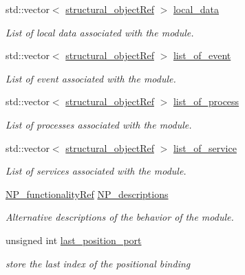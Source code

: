 \begin{DoxyCompactItemize}
std\+::vector$<$ \hyperlink{structural__objects_8hpp_a8ea5f8cc50ab8f4c31e2751074ff60b2}{structural\+\_\+object\+Ref} $>$ \hyperlink{classmodule_a8b44d9d75fa61b8dd0fc7d7859b59274}{local\+\_\+data}
\begin{DoxyCompactList}\small\item\em List of local data associated with the module. \end{DoxyCompactList}\item 
std\+::vector$<$ \hyperlink{structural__objects_8hpp_a8ea5f8cc50ab8f4c31e2751074ff60b2}{structural\+\_\+object\+Ref} $>$ \hyperlink{classmodule_a421dffcbfc875ebb774e447559f16623}{list\+\_\+of\+\_\+event}
\begin{DoxyCompactList}\small\item\em List of event associated with the module. \end{DoxyCompactList}\item 
std\+::vector$<$ \hyperlink{structural__objects_8hpp_a8ea5f8cc50ab8f4c31e2751074ff60b2}{structural\+\_\+object\+Ref} $>$ \hyperlink{classmodule_afc76e2f7629ee00a39914d17e6b9f6de}{list\+\_\+of\+\_\+process}
\begin{DoxyCompactList}\small\item\em List of processes associated with the module. \end{DoxyCompactList}\item 
std\+::vector$<$ \hyperlink{structural__objects_8hpp_a8ea5f8cc50ab8f4c31e2751074ff60b2}{structural\+\_\+object\+Ref} $>$ \hyperlink{classmodule_aad1399af2e7d2c801d32cd6cac605876}{list\+\_\+of\+\_\+service}
\begin{DoxyCompactList}\small\item\em List of services associated with the module. \end{DoxyCompactList}\item 
\hyperlink{NP__functionality_8hpp_aacd74315d343c1054cd3c01e18627049}{N\+P\+\_\+functionality\+Ref} \hyperlink{classmodule_a4277830832806c906445867354a3328c}{N\+P\+\_\+descriptions}
\begin{DoxyCompactList}\small\item\em Alternative descriptions of the behavior of the module. \end{DoxyCompactList}\item 
unsigned int \hyperlink{classmodule_a4e0286f0c329b668f81431d202609c08}{last\+\_\+position\+\_\+port}
\begin{DoxyCompactList}\small\item\em store the last index of the positional binding \end{DoxyCompactList}\item 

\end{DoxyCompactItemize}
